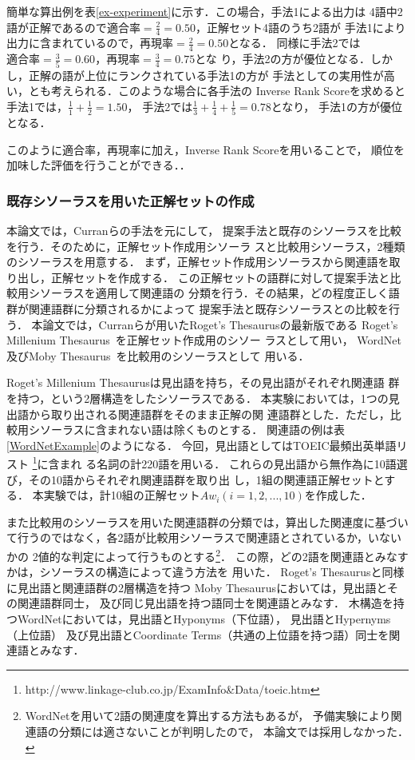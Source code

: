 \documentclass[japanese]{jnlp_1.3a}
\begin{document}
簡単な算出例を表\ref{ex-experiment}に示す．この場合，手法1による出力は
4語中2語が正解であるので$適合率=\frac{2}{4}=0.50$，正解セット4語のうち2語が
手法1により出力に含まれているので，$再現率=\frac{2}{4}=0.50$となる．
同様に手法2では$適合率=\frac{3}{5}=0.60$，$再現率=\frac{3}{4}=0.75$とな
り，手法2の方が優位となる．しかし，正解の語が上位にランクされている手法1の方が
手法としての実用性が高い，とも考えられる．このような場合に各手法の
Inverse Rank Scoreを求めると手法1では，$\frac{1}{1}+\frac{1}{2}=1.50$，
手法2では$\frac{1}{3}+\frac{1}{4}+\frac{1}{5}=0.78$となり，
手法1の方が優位となる．

このように適合率，再現率に加え，Inverse Rank Scoreを用いることで，
順位を加味した評価を行うことができる．\cite{Widdows02,Curran02}．



\subsubsection{既存シソーラスを用いた正解セットの作成}
本論文では，Curranら\cite{Curran02}の手法を元にして，
提案手法と既存のシソーラスを比較を行う．そのために，正解セット作成用シソーラ
スと比較用シソーラス，2種類のシソーラスを用意する．
まず，正解セット作成用シソーラスから関連語を取り出し，正解セットを作成する．
この正解セットの語群に対して提案手法と比較用シソーラスを適用して関連語の
分類を行う．その結果，どの程度正しく語群が関連語群に分類されるかによって
提案手法と既存シソーラスとの比較を行う．
本論文では，Curranらが用いたRoget's Thesaurusの最新版である
Roget's Millenium Thesaurus~\cite{RogetMillenium}を正解セット作成用のシソー
ラスとして用い，
WordNet及びMoby Thesaurus~\cite{MobyThesaurus}を比較用のシソーラスとして
用いる．

Roget's Millenium Thesaurusは見出語を持ち，その見出語がそれぞれ関連語
群を持つ，という2層構造をしたシソーラスである．
本実験においては，1つの見出語から取り出される関連語群をそのまま正解の関
連語群とした．ただし，比較用シソーラスに含まれない語は除くものとする．
関連語の例は表\ref{WordNetExample}のようになる．
今回，見出語としてはTOEIC最頻出英単語リスト
    \footnote{http://www.linkage-club.co.jp/ExamInfo\&Data/toeic.htm}に含まれ
る名詞の計220語を用いる．
これらの見出語から無作為に10語選び，その10語からそれぞれ関連語群を取り出
し，1組の関連語正解セットとする．
本実験では，計10組の正解セット$Aw_i(i=1,2,...,10)$を作成した．


また比較用のシソーラスを用いた関連語群の分類では，算出した関連度に基づい
て行うのではなく，各2語が比較用シソーラスで関連語とされているか，いないかの
2値的な判定によって行うものとする\footnote{WordNetを用いて2語の関連度を算出する方法もあるが，
予備実験により関連語の分類には適さないことが判明したので，
本論文では採用しなかった．}．
この際，どの2語を関連語とみなすかは，シソーラスの構造によって違う方法を
用いた．
Roget's Thesaurusと同様に見出語と関連語群の2層構造を持つ
Moby Thesaurusにおいては，見出語とその関連語群同士，
及び同じ見出語を持つ語同士を関連語とみなす．
木構造を持つWordNetにおいては，見出語とHyponyms（下位語），
見出語とHypernyms（上位語）
及び見出語とCoordinate Terms（共通の上位語を持つ語）同士を関連語とみなす．
\end{document}
